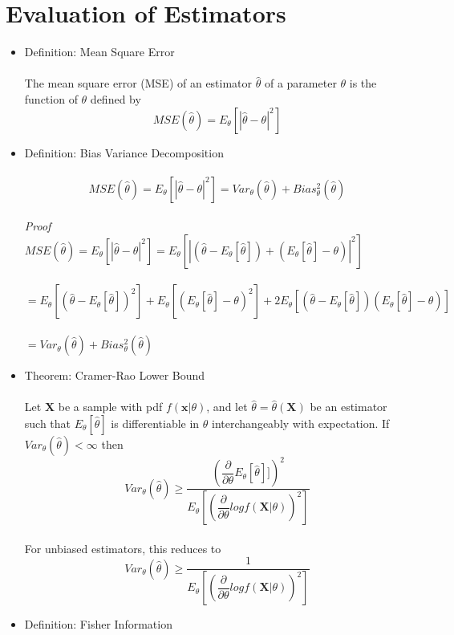 \documentclass{article}
\begin{document}
\section{Evaluation of Estimators}
\begin{itemize}
    \item Definition: Mean Square Error\\\\
    The mean square error (MSE) of an estimator $\hat{\theta}$ of a parameter $\theta$ is the function of $\theta$ defined by\\
    $$MSE(\hat{\theta})=E_\theta[|\hat{\theta}-\theta|^2]$$
    \item Definition: Bias Variance Decomposition\\\\
    $$MSE(\hat{\theta})=E_\theta[|\hat{\theta}-\theta|^2]=Var_\theta(\hat{\theta})+Bias_\theta^2(\hat{\theta})$$\\
    \emph{Proof}\\
    $MSE(\hat{\theta})=E_\theta[|\hat{\theta}-\theta|^2]=E_\theta[|(\hat{\theta}-E_\theta[\hat{\theta}])+(E_\theta[\hat{\theta}]-\theta)|^2]$\\\\
    $=E_\theta[(\hat{\theta}-E_\theta[\hat{\theta}])^2]+E_\theta[(E_\theta[\hat{\theta}]-\theta)^2]+2E_\theta[(\hat{\theta}-E_\theta[\hat{\theta}])(E_\theta[\hat{\theta}]-\theta)]$\\\\
    $=Var_\theta(\hat{\theta})+Bias_\theta^2(\hat{\theta})$
    \item Theorem: Cramer-Rao Lower Bound\\\\
    Let $\textbf{X}$ be a sample with pdf $f(\textbf{x}|\theta)$, and let $\hat{\theta}=\hat{\theta}(\textbf{X})$ be an estimator such that $E_\theta[\hat{\theta}]$ is differentiable in $\theta$ interchangeably with expectation.  If $Var_\theta(\hat{\theta})<\infty$ then\\
    $$Var_\theta(\hat{\theta})\geq\dfrac{(\dfrac{\partial}{\partial\theta}E_\theta[\hat{\theta}]])^2}{E_\theta[(\dfrac{\partial}{\partial\theta}logf(\textbf{X}|\theta))^2]}$$\\
    For unbiased estimators, this reduces to\\
    $$Var_\theta(\hat{\theta})\geq\dfrac{1}{E_\theta[(\dfrac{\partial}{\partial\theta}logf(\textbf{X}|\theta))^2]}$$
    \item Definition: Fisher Information\\\\

\end{itemize}
\end{document}
